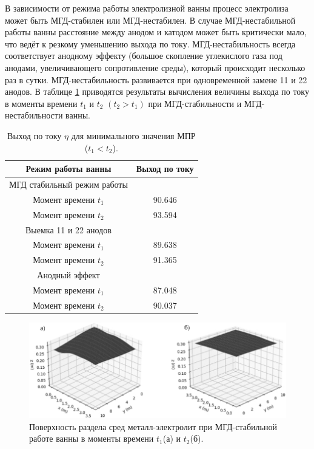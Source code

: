 \documentclass[pdflatex,sn-mathphys-gost]{pmi-jnl}
\begin{document}
В зависимости от режима работы электролизной ванны процесс электролиза может быть МГД-стабилен или МГД-нестабилен. В случае МГД-нестабильной работы ванны расстояние между анодом и катодом может быть критически мало, что ведёт к резкому уменьшению выхода по току. МГД-нестабильность всегда соответствует анодному эффекту (большое скопление углекислого газа под анодами, увеличивающего сопротивление среды), который происходит несколько раз в сутки. МГД-нестабильность развивается при одновременной замене 11 и 22 анодов. В таблице \ref{table:vihPoToku} приводятся результаты вычисления величины выхода по току в моменты времени $t_1$ и $t_2$ $(t_2>t_1)$ при МГД-стабильности и МГД-нестабильности ванны. 

\begin{table}[h]
\caption{Выход по току $\eta$ для минимального значения МПР ($t_1 < t_2$).} \label{table:vihPoToku}
\centering
\begin{tabular}{|c|c|}
\hline
Режим работы ванны &Выход по току	\\
\hline
МГД стабильный режим работы &	\\
Момент времени $t_1$			&90.646	\\ 
Момент времени $t_2$		&93.594	\\  
\hline
Выемка 11 и 22 анодов &	\\
Момент времени $t_1$		&89.638	\\  
Момент времени $t_2$		&91.365	\\  
\hline
Анодный эффект &	\\
Момент времени $t_1$	&87.048	\\  
Момент времени $t_2$	&90.037	\\  
\hline
\end{tabular}
\end{table}

\begin{figure}[ht]
    \centering
    \includegraphics[width=150mm]{спокойная поверхность.png}
    \caption{Поверхность раздела сред металл-электролит при МГД-стабильной работе ванны в моменты времени $t_1$(а) и $t_2$(б).}
    \label{fig:stab} 
\end{figure}
\end{document}
